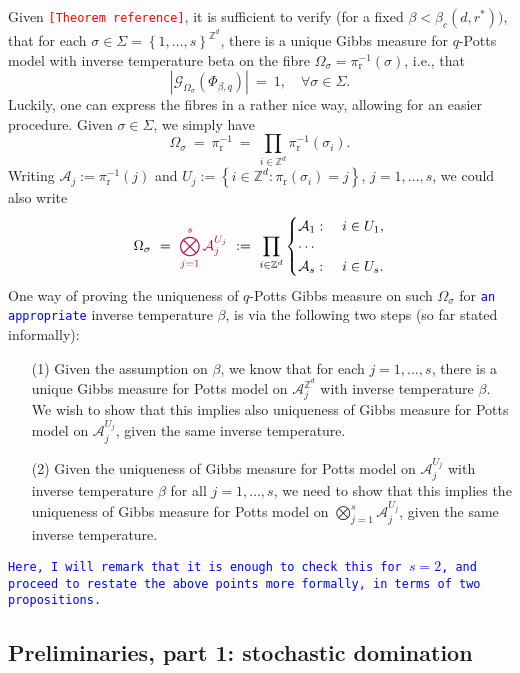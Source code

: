 \documentclass[12pt]{article}
\newcommand{\A}{\mathcal{A}}
\newcommand{\G}{\mathcal{G}}
\renewcommand{\r}{\mathrm{r}}
\newcommand{\Z}{\mathbb{Z}}
\newcommand{\set}[1]{\left\{#1\right\}}
\newcommand{\1}{\mathbbm{1}}
\newcommand{\5}{\vspace{0.5cm}}
\theoremstyle{definition}
\begin{document}
Given \textcolor{red}{\texttt{[Theorem reference]}}, it is sufficient to verify (for a fixed $\beta<\beta_c(d,r^*))$, that for each $\sigma\in\Sigma=\set{1,\ldots,s}^{\Z^d}$, there is a unique Gibbs measure for $q$-Potts model with inverse temperature beta on the fibre $\Omega_\sigma=\pi_\r^{-1}(\sigma)$, i.e., that
$$|\G_{\Omega_\sigma}(\Phi_{\beta,q})| ~=~ 1, \quad \forall \sigma\in\Sigma.$$
Luckily, one can express the fibres in a rather nice way, allowing for an easier procedure. Given $\sigma\in\Sigma$, we simply have
$$\Omega_\sigma ~=~ \pi_{\r}^{-1} ~=~ \prod_{i\in\Z^d}\pi_{\r}^{-1}(\sigma_i).$$
Writing $\A_j:=\pi_{\r}^{-1}(j)$ and $U_j:=\set{i\in\Z^d:\pi_{\r}(\sigma_i)=j}$, $j=1,\ldots,s$, we could also write
$$\Omega_\sigma ~=~ \textcolor{purple}{\bigotimes_{j=1}^s\A_j^{U_j}} ~:=~ \prod_{i\in\Z^d}\begin{cases}\A_1:~&i\in U_1,\\
\cdots\\
\A_s:~&i\in U_s.\end{cases}$$
One way of proving the uniqueness of $q$-Potts Gibbs measure on such $\Omega_\sigma$ for \textcolor{blue}{\texttt{an appropriate}} inverse temperature $\beta$, is via the following two steps (so far stated informally):
\begin{itemize}
	\item[(1)] Given the assumption on $\beta$, we know that for each $j=1,\ldots,s$, there is a unique Gibbs measure for Potts model on $\A_j^{\Z^d}$ with inverse temperature $\beta$. We wish to show that this implies also uniqueness of Gibbs measure for Potts model on $\A_j^{U_j}$, given the same inverse temperature.
	\item[(2)] Given the uniqueness of Gibbs measure for Potts model on $\A_j^{U_j}$ with inverse temperature $\beta$ for all $j=1,\ldots,s$, we need to show that this implies the uniqueness of Gibbs measure for Potts model on $\bigotimes_{j=1}^s \A_j^{U_j}$, given the same inverse temperature.
\end{itemize}
\textcolor{blue}{\texttt{Here, I will remark that it is enough to check this for $s=2$, and proceed to restate the above points more formally, in terms of two propositions.}}


\subsection{Preliminaries, part 1: stochastic domination}
\end{document}
